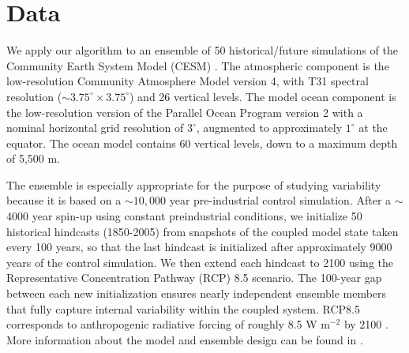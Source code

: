\documentclass{ametsoc}
\begin{document}


\section{Data}
\label{sec:data}

We apply our algorithm to an ensemble of 50 historical/future simulations of the Community Earth System Model (CESM) \citep{sriver2015effects}.  The atmospheric component is the low-resolution Community Atmosphere Model version 4, with T31 spectral resolution (${\sim}3.75^\circ \times 3.75^\circ$) and 26 vertical levels. The model ocean component is the low-resolution version of the Parallel Ocean Program version 2 \citep{smith2010parallel} with a nominal horizontal grid resolution of $3^\circ$, augmented to approximately $1^\circ$ at the equator. The ocean model contains 60 vertical levels, down to a maximum depth of 5,500 m. 

The ensemble is especially appropriate for the purpose of studying variability because it is based on a ${\sim}10,000$ year pre-industrial control simulation. After a $\sim$4000 year spin-up using constant preindustrial conditions, we initialize 50 historical hindcasts (1850-2005) from snapshots of the coupled model state taken every 100 years, so that  the last hindcast is initialized after approximately 9000 years of the control simulation. We then
 extend each hindcast to 2100 using the Representative Concentration Pathway (RCP) 8.5 scenario. The 100-year gap between each new initialization ensures nearly independent ensemble members that fully capture internal variability within the coupled system. RCP8.5 corresponds to anthropogenic radiative forcing of roughly 8.5 W m$^{-2}$ by 2100 \citep{moss2010next}. More information about the model and ensemble design can be found in \citet{sriver2015effects}.

\end{document}
